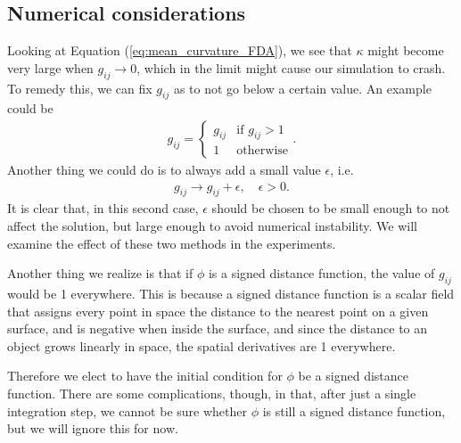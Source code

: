 \documentclass[acmtog]{acmart}
\begin{document}
\subsection{Numerical considerations}
Looking at Equation (\ref{eq:mean_curvature_FDA}), we see that $\kappa$ might
become very large when $g_{ij} \to 0$, which in the limit might cause our
simulation to crash. To remedy this, we can fix $g_{ij}$ as to not go below a
certain value. An example could be
%
\begin{align}
  g_{ij} = \begin{cases}
             g_{ij} & \text{if } g_{ij} > 1 \\
             1      & \text{otherwise}
           \end{cases}. \label{eq:g_clamp}
\end{align}
%
Another thing we could do is to always add a small value $\epsilon$, i.e.
%
\begin{align}
  g_{ij} \to g_{ij} + \epsilon, \quad \epsilon > 0.
\end{align}
%
It is clear that, in this second case, $\epsilon$ should be chosen to be small
enough to not affect the solution, but large enough to avoid numerical
instability. We will examine the effect of these two methods in the
experiments.

Another thing we realize is that if $\phi$ is a signed distance function, the
value of $g_{ij}$ would be 1 everywhere. This is because a signed distance
function is a scalar field that assigns every point in space the distance to
the nearest point on a given surface, and is negative when inside the surface,
and since the distance to an object grows linearly in space, the spatial
derivatives are 1 everywhere.

Therefore we elect to have the initial condition for $\phi$ be a signed
distance function. There are some complications, though, in that, after just a
single integration step, we cannot be sure whether $\phi$ is still a signed
distance function, but we will ignore this for now.
\end{document}
